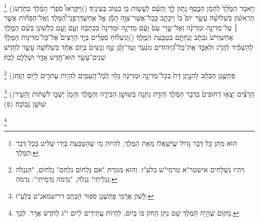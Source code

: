 \documentclass[12pt, openany]{book}
\newcommand{\footnotecomment}[1]{
	\renewcommand\thefootnote{}
	\footnote{\textsf{#1}}}
\newcommand{\commenta}[1]{\footnotecomment{#1}\hspace{0em}}
\newcommand{\vsnum}[1]{(\hebrewnumeral{#1})\space}
\begin{document}
\begin{multicols}{2}
\commenta{ הוּא מַתַּן כָּל דָּבָר גָּדוֹל שֶׁיִּשְׁאֲלוּ מֵאֵת הַמֶּלֶךְ, לִהְיוֹת מִי שֶׁהַטַּבַּעַת בְּיָדוֹ שַׁלִּיט בְּכָל דְּבַר הַמֶּלֶךְ: }%
\vsnum{11}וַיֹּ֤אמֶר הַמֶּ֙לֶךְ֙ לְהָמָ֔ן הַכֶּ֖סֶף נָת֣וּן לָ֑ךְ וְהָעָ֕ם לַעֲשׂ֥וֹת בּ֖וֹ כַּטּ֥וֹב בְּעֵינֶֽיךָ׃
\vsnum{12}וַיִּקָּרְאוּ֩ סֹפְרֵ֨י הַמֶּ֜לֶךְ בַּחֹ֣דֶשׁ הָרִאשׁ֗וֹן בִּשְׁלוֹשָׁ֨ה עָשָׂ֣ר יוֹם֮ בּוֹ֒ וַיִּכָּתֵ֣ב כְּֽכָל־אֲשֶׁר־צִוָּ֣ה הָמָ֡ן אֶ֣ל אֲחַשְׁדַּרְפְּנֵֽי־הַ֠מֶּלֶךְ וְֽאֶל־הַפַּח֞וֹת אֲשֶׁ֣ר ׀ עַל־מְדִינָ֣ה וּמְדִינָ֗ה וְאֶל־שָׂ֤רֵי עַם֙ וָעָ֔ם מְדִינָ֤ה וּמְדִינָה֙ כִּכְתָבָ֔הּ וְעַ֥ם וָעָ֖ם כִּלְשׁוֹנ֑וֹ בְּשֵׁ֨ם הַמֶּ֤לֶךְ אֲחַשְׁוֵרֹשׁ֙ נִכְתָּ֔ב וְנֶחְתָּ֖ם בְּטַבַּ֥עַת הַמֶּֽלֶךְ׃
\vsnum{13}וְנִשְׁל֨וֹחַ סְפָרִ֜ים בְּיַ֣ד הָרָצִים֮ אֶל־כָּל־מְדִינ֣וֹת הַמֶּלֶךְ֒ לְהַשְׁמִ֡יד לַהֲרֹ֣ג וּלְאַבֵּ֣ד אֶת־כָּל־הַ֠יְּהוּדִים מִנַּ֨עַר וְעַד־זָקֵ֜ן טַ֤ף וְנָשִׁים֙ בְּי֣וֹם אֶחָ֔ד בִּשְׁלוֹשָׁ֥ה עָשָׂ֛ר לְחֹ֥דֶשׁ שְׁנֵים־עָשָׂ֖ר הוּא־חֹ֣דֶשׁ אֲדָ֑ר וּשְׁלָלָ֖ם לָבֽוֹז׃%
\commenta{ וְיִהְיוּ נִשְׁלָחִים אישטר"א טרמי"ש בלע"ז. וְהוּא מִגִּזְרַת "אִם נִלְחוֹם נִלְחַם" נִלְחוֹם, "הַנִגְלֹה נִגְלֵיתִי" נִגְלֹה, "נִדְמֹה נִדְמֵיתִי": נִדְמֹה: }%
\vsnum{14}פַּתְשֶׁ֣גֶן הַכְּתָ֗ב לְהִנָּ֤תֵֽן דָּת֙ בְּכָל־מְדִינָ֣ה וּמְדִינָ֔ה גָּל֖וּי לְכָל־הָֽעַמִּ֑ים לִהְי֥וֹת עֲתִדִ֖ים לַיּ֥וֹם הַזֶּֽה׃%
\commenta{ לָשׁוֹן אֲרַמִּי פַּתְשֶׁגֶן סִפּוּר הַכְּתָב דרישמאנ"ט בְּלַעַ"ז: }%
\vsnum{15}הָֽרָצִ֞ים יָצְא֤וּ דְחוּפִים֙ בִּדְבַ֣ר הַמֶּ֔לֶךְ וְהַדָּ֥ת נִתְּנָ֖ה בְּשׁוּשַׁ֣ן הַבִּירָ֑ה וְהַמֶּ֤לֶךְ וְהָמָן֙ יָשְׁב֣וּ לִשְׁתּ֔וֹת וְהָעִ֥יר שׁוּשָׁ֖ן נָבֽוֹכָה׃ (פ)%
\commenta{ מָקוֹם שֶׁהָיָה הַמֶּלֶךְ שָׁם נִתַּן הַחֹק בּוֹ בַיּוֹם, לִהְיוֹת עֲתִידִים לְיוֹם י"ג לְחֹדֶשׁ אֲדָר. לְכַךְ, }%
\end{multicols}\clearpage
\end{document}
